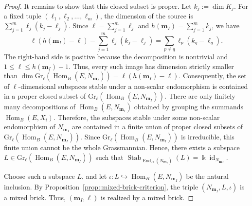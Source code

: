 \documentclass[a4,12pt]{amsart}
\numberwithin{equation}{section} %
\def\Hom{\operatorname{Hom}} %
\def\End{\operatorname{End}} %
\def\Stab{\operatorname{Stab}} %
\def\Gr{\mathrm{Gr}} %
\theoremstyle{definition} %
\begin{document}
\begin{proof}
It remains to show that this closed subset is proper.
Let $k_j:=\dim K_j$. For a fixed tuple $(\ell_1,\ell_2,\ldots,\ell_m)$, the dimension of the source is $\sum_{j=1}^m\ell_j(k_j-\ell_j)$. Since $\ell=\sum_{j=1}^m\ell_j$ and $h(\mathbf{m}_I)=\sum_{j=1}^m k_j$, we have
\[
\ell(h(\mathbf{m}_I)-\ell)-\sum_{j=1}^m\ell_j(k_j-\ell_j)
=
\sum_{p\neq q}\ell_p(k_q-\ell_q).
\]
The right-hand side is positive because the decomposition is nontrivial and $1\leq\ell\leq h(\mathbf{m}_I)-1$. Thus, every such image has dimension strictly smaller than $\dim\Gr_\ell(\Hom_B(E,N_{\mathbf{m}_I}))=\ell(h(\mathbf{m}_I)-\ell)$.
Consequently, the set of $\ell$-dimensional subspaces stable under a non-scalar endomorphism is contained in a proper closed subset of $\Gr_\ell(\Hom_B(E,N_{\mathbf{m}_I}))$. There are only finitely many decompositions of $\Hom_B(E,N_{\mathbf{m}_I})$ obtained by grouping the summands $\Hom_B(E,X_i)$.
Therefore, the subspaces stable under some non-scalar endomorphism of $N_{\mathbf{m}_I}$ are contained in a finite union of proper closed subsets of $\Gr_\ell(\Hom_B(E,N_{\mathbf{m}_I}))$.
Since $\Gr_\ell(\Hom_B(E,N_{\mathbf{m}_I}))$ is irreducible, this finite union cannot be the whole Grassmannian.
Hence, there exists a subspace $L\in\Gr_\ell(\Hom_B(E,N_{\mathbf{m}_I}))$ such that $\Stab_{\End_B(N_{\mathbf{m}_I})}(L)=\Bbbk\operatorname{id}_{N_{\mathbf{m}_I}}$.

Choose such a subspace $L$, and let $\iota\colon L\hookrightarrow \Hom_B(E,N_{\mathbf{m}_I})$ be the natural inclusion.
By Proposition~\ref{prop::mixed-brick-criterion}, the triple $(N_{\mathbf{m}_I},L,\iota)$ is a mixed brick.
Thus, $(\mathbf{m}_I,\ell)$ is realized by a mixed brick.
\end{proof}
\end{document}
